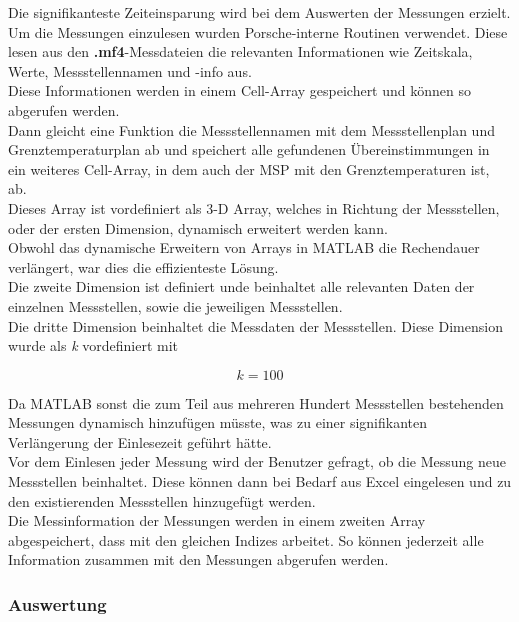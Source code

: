 Die signifikanteste Zeiteinsparung wird bei dem Auswerten der Messungen erzielt. \\
Um die Messungen einzulesen wurden Porsche-interne Routinen verwendet. Diese lesen aus den \textbf{.mf4}-Messdateien die relevanten Informationen wie Zeitskala, Werte, Messstellennamen und -info aus. \\
Diese Informationen werden in einem Cell-Array gespeichert und können so abgerufen werden. \\
Dann gleicht eine Funktion die Messstellennamen mit dem Messstellenplan und Grenztemperaturplan ab und speichert alle gefundenen Übereinstimmungen in ein weiteres Cell-Array, in dem auch der MSP mit den Grenztemperaturen ist, ab. \\
Dieses Array ist vordefiniert als 3-D Array, welches in Richtung der Messstellen, oder der ersten Dimension, dynamisch erweitert werden kann. \\
Obwohl das dynamische Erweitern von Arrays in MATLAB die Rechendauer verlängert, war dies die effizienteste Lösung.\\
Die zweite Dimension ist definiert unde beinhaltet alle relevanten Daten der einzelnen Messstellen, sowie die jeweiligen Messstellen. \\

\newpage
Die dritte Dimension beinhaltet die Messdaten der Messstellen. Diese Dimension wurde als \textit{k} vordefiniert mit 

\begin{equation}
	k = 100
\end{equation}

Da MATLAB sonst die zum Teil aus mehreren Hundert Messstellen bestehenden Messungen dynamisch hinzufügen müsste, was zu einer signifikanten Verlängerung der Einlesezeit geführt hätte.\\
Vor dem Einlesen jeder Messung wird der Benutzer gefragt, ob die Messung neue Messstellen beinhaltet. Diese können dann bei Bedarf aus Excel eingelesen und zu den existierenden Messstellen hinzugefügt werden. \\
Die Messinformation der Messungen werden in einem zweiten Array abgespeichert, dass mit den gleichen Indizes arbeitet. So können jederzeit alle Information zusammen mit den Messungen abgerufen werden. \\

\subsubsection{Auswertung}

